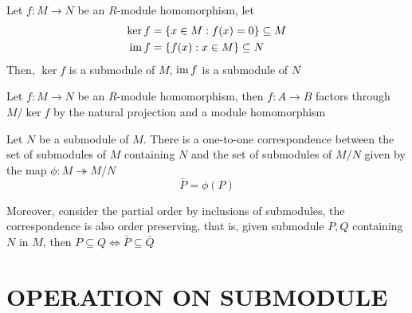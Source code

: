 \begin{remark}
	Let $f: M \to N$ be an $R$-module homomorphism, let 
	\begin{align*}
		\ker f &= \{x \in M: f(x) = 0\} \subseteq M\\
		\operatorname{im} f &= \{f(x): x \in M\} \subseteq N
	\end{align*}
	Then, $\ker f$ is a submodule of $M$, $\operatorname{im} f$ is a submodule of $N$
\end{remark}

\begin{theorem}
	Let $f: M \to N$ be an $R$-module homomorphism, then $f: A \to B$ factors through $M / \ker f$ by the natural projection and a module homomorphism
	\begin{center}
	\end{center}
\end{theorem}

\begin{theorem}
	Let $N$ be a submodule of $M$. There is a one-to-one correspondence between the set of submodules of $M$ containing $N$ and the set of submodules of $M / N$ given by the map $\phi: M \twoheadrightarrow M / N$
	$$
		\bar{P} = \phi(P)
	$$
	
	Moreover, consider the partial order by inclusions of submodules, the correspondence is also order preserving, that is, given submodule $P, Q$ containing $N$ in $M$, then $P \subseteq Q \iff \bar{P} \subseteq \bar{Q}$
	\begin{center}
	\end{center}
\end{theorem}

\section{OPERATION ON SUBMODULE}

